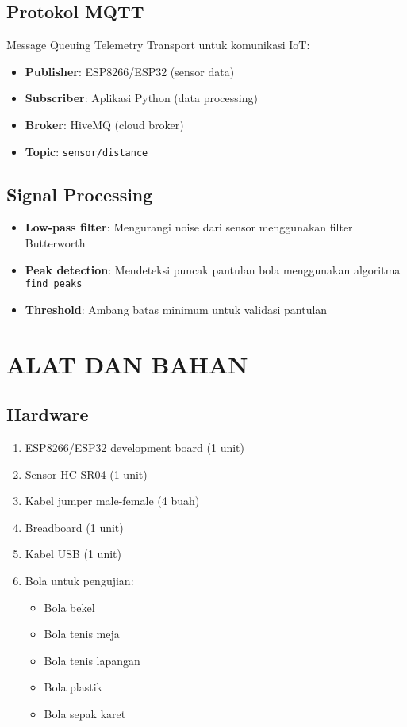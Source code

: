 \documentclass[12pt,a4paper]{article}
\begin{document}
\subsection{Protokol MQTT}
Message Queuing Telemetry Transport untuk komunikasi IoT:
\begin{itemize}
    \item \textbf{Publisher}: ESP8266/ESP32 (sensor data)
    \item \textbf{Subscriber}: Aplikasi Python (data processing)
    \item \textbf{Broker}: HiveMQ (cloud broker)
    \item \textbf{Topic}: \texttt{sensor/distance}
\end{itemize}

\subsection{Signal Processing}
\begin{itemize}
    \item \textbf{Low-pass filter}: Mengurangi noise dari sensor menggunakan filter Butterworth
    \item \textbf{Peak detection}: Mendeteksi puncak pantulan bola menggunakan algoritma \texttt{find\_peaks}
    \item \textbf{Threshold}: Ambang batas minimum untuk validasi pantulan
\end{itemize}

\section{ALAT DAN BAHAN}

\subsection{Hardware}
\begin{enumerate}
    \item ESP8266/ESP32 development board (1 unit)
    \item Sensor HC-SR04 (1 unit)
    \item Kabel jumper male-female (4 buah)
    \item Breadboard (1 unit)
    \item Kabel USB (1 unit)
    \item Bola untuk pengujian:
    \begin{itemize}
        \item Bola bekel
        \item Bola tenis meja  
        \item Bola tenis lapangan
        \item Bola plastik
        \item Bola sepak karet
    \end{itemize}
\end{enumerate}
\end{document}
